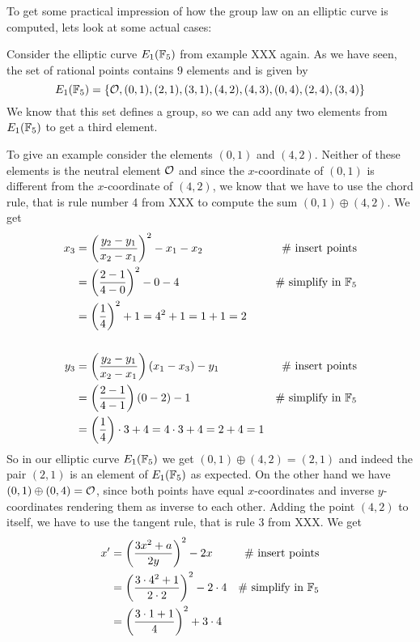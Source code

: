 To get some practical impression of how the group law on an elliptic curve is computed, lets look at some actual cases:
\begin{example}Consider the elliptic curve $E_1(\mathbb{F}_5)$ from example XXX again.  As we have seen, the set of rational points contains $9$ elements and is given by
$$
E_1(\mathbb{F}_5) = \{\mathcal{O}, (0,1),(2,1),(3,1),(4,2),(4,3),(0,4),(2,4),(3,4)\}
$$
We know that this set defines a group, so we can add any two elements from $E_1(\mathbb{F}_5)$ to get a third element.

To give an example consider the elements $(0,1)$ and $(4,2)$. Neither of these elements is the neutral element $\mathcal{O}$ and since the $x$-coordinate of $(0,1)$ is different from the $x$-coordinate of $(4,2)$, we know that we have to use the chord rule, that is rule number 4 from XXX to compute the sum $(0,1)\oplus (4,2)$. We get
\begin{align*}
x_3  & = \left(\frac{y_2-y_1}{x_2-x_1}\right)^2 -x_1-x_2 & \text{\# insert points}\\
     & = \left(\frac{2-1}{4-0}\right)^2 -0-4  & \text{\# simplify in } \mathbb{F}_5\\
     & = \left(\frac{1}{4}\right)^2 +1
       = 4^2 +1
       = 1 +1
       = 2
\\
\\
y_3  & = \left(\frac{y_2-y_1}{x_2-x_1} \right)\left(x_1-x_3\right) - y_1  & \text{\# insert points}\\
     & = \left(\frac{2-1}{4-1} \right)\left(0-2\right) - 1   & \text{\# simplify in } \mathbb{F}_5\\
     & = \left(\frac{1}{4} \right)\cdot 3 + 4
       = 4\cdot 3 + 4
       = 2 + 4
       = 1
\end{align*}
So in our elliptic curve $E_1(\mathbb{F}_5)$ we get $(0,1)\oplus (4,2) =(2,1)$ and indeed the pair $(2,1)$ is an element of $E_1(\mathbb{F}_5)$ as expected. On the other hand we have $(0,1)\oplus (0,4) =\mathcal{O}$, since both points have equal $x$-coordinates and inverse $y$-coordinates rendering them as inverse to each other. Adding the point $(4,2)$ to itself, we have to use the tangent rule, that is rule 3 from XXX. We get
\begin{align*}
x'  & = \left(\frac{3x^2+a}{2y}\right)^2 -2x   & \text{\# insert points}\\
    & = \left(\frac{3\cdot 4^2+1}{2\cdot 2}\right)^2 -2\cdot 4 & \text{\# simplify in } \F_5 \\
    & = \left(\frac{3\cdot 1+1}{4}\right)^2 +3\cdot 4

\end{align*}
\end{example}
